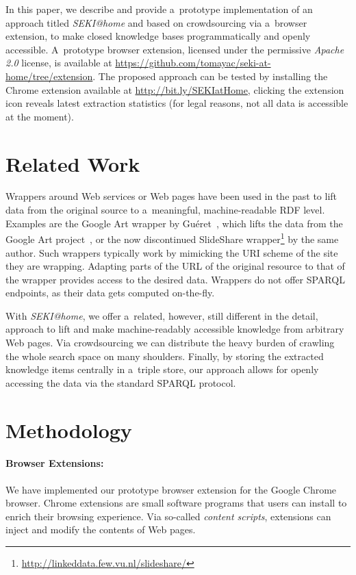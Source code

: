 \documentclass[runningheads,a4paper]{llncs}
\begin{document}
In this paper, we describe and provide a~prototype implementation
of an approach titled \emph{SEKI@home} and
based on crowdsourcing via a~browser extension,
to make closed knowledge bases programmatically and openly accessible.
A~prototype browser extension,
licensed under the permissive \emph{Apache 2.0} license,
is available at \url{https://github.com/tomayac/seki-at-home/tree/extension}.
The proposed approach can be tested by installing the Chrome extension
available at \url{http://bit.ly/SEKIatHome},
clicking the extension icon reveals latest extraction statistics
(for legal reasons, not all data is accessible at the moment).

\section{Related Work} \label{sec:related-work}
Wrappers around Web services or Web pages have been used in the past
to lift data from the original source to a~meaningful, machine-readable RDF level.
Examples are the Google Art wrapper by Guéret~\cite{gueret2011},
which lifts the data from the Google Art project~\cite{sood2011},
or the now discontinued SlideShare wrapper\footnote{\url{http://linkeddata.few.vu.nl/slideshare/}} by the same author.
Such wrappers typically work by mimicking the URI scheme of the site they are wrapping.
Adapting parts of the URL of the original resource to that of the wrapper
provides access to the desired data.
Wrappers do not offer SPARQL endpoints, as their data gets computed on-the-fly.

With \emph{SEKI@home}, we offer a~related, however, still different in the detail,
approach to lift and make machine-readably accessible
knowledge from arbitrary Web pages.
Via crowdsourcing we can distribute the heavy burden
of crawling the whole search space on many shoulders.
Finally, by storing the extracted knowledge items centrally in a~triple store,
our approach allows for openly accessing the data via the standard SPARQL protocol.

\section{Methodology} \label{sec:methodology}
\paragraph{Browser Extensions:}
We have implemented our prototype browser extension for the Google Chrome browser.
Chrome extensions are small software programs that users can install
to enrich their browsing experience.
Via so-called \emph{content scripts},
extensions can inject and modify the contents of Web pages.
\end{document}

